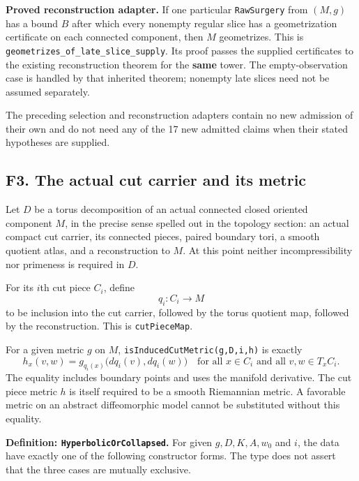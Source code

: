 \documentclass[
  letterpaper,
  11pt]{article}
\begin{document}
\textbf{Proved reconstruction adapter.} If one particular
{\small\texttt{Raw\allowbreak{}Surgery}} from \((M,g)\) has a bound
\(B\) after which every nonempty regular slice has a geometrization
certificate on each connected component, then \(M\) geometrizes. This is
{\small\texttt{geometrizes\_\allowbreak{}of\_\allowbreak{}late\_\allowbreak{}slice\_\allowbreak{}supply}}.
Its proof passes the supplied certificates to the existing
reconstruction theorem for the \textbf{same} tower. The
empty-observation case is handled by that inherited theorem; nonempty
late slices need not be assumed separately.

The preceding selection and reconstruction adapters contain no new
admission of their own and do not need any of the 17 new admitted claims
when their stated hypotheses are supplied.

\subsection{F3. The actual cut carrier and its
metric}\label{f3-induced-cut-metric}

Let \(D\) be a torus decomposition of an actual connected closed
oriented component \(M\), in the precise sense spelled out in the
topology section: an actual compact cut carrier, its connected pieces,
paired boundary tori, a smooth quotient atlas, and a reconstruction to
\(M\). At this point neither incompressibility nor primeness is required
in \(D\).

For its \(i\)th cut piece \(C_i\), define \[
 q_i:C_i\longrightarrow M
\] to be inclusion into the cut carrier, followed by the torus quotient
map, followed by the reconstruction. This is
{\small\texttt{cut\allowbreak{}Piece\allowbreak{}Map}}.

For a given metric \(g\) on \(M\),
{\small\texttt{is\allowbreak{}Induced\allowbreak{}Cut\allowbreak{}Metric(g,D,i,h)}}
is exactly \[
 h_x(v,w)=g_{q_i(x)}\bigl(dq_i(v),dq_i(w)\bigr)
 \quad\text{for all }x\in C_i\text{ and all }v,w\in T_xC_i.
\] The equality includes boundary points and uses the manifold
derivative. The cut piece metric \(h\) is itself required to be a smooth
Riemannian metric. A favorable metric on an abstract diffeomorphic model
cannot be substituted without this equality.

\textbf{Definition:
{\small\texttt{Hyperbolic\allowbreak{}Or\allowbreak{}Collapsed}}.} For
given \(g,D,K,A,w_0\) and \(i\), the data have exactly one of the
following constructor forms. The type does not assert that the three
cases are mutually exclusive.
\end{document}
